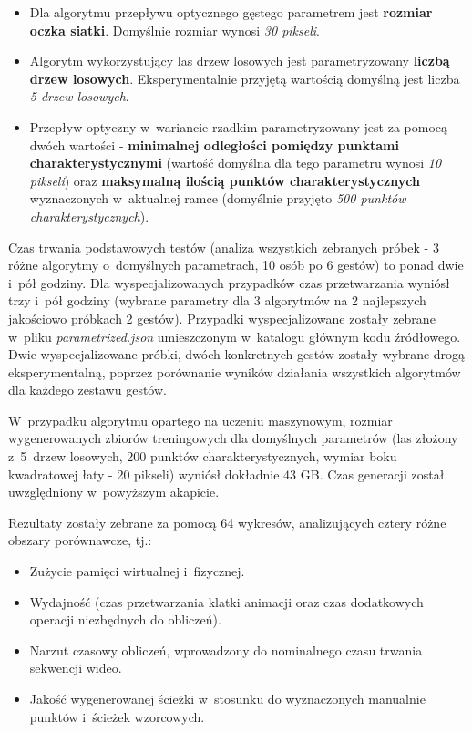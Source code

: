       \begin{itemize}
        \item Dla algorytmu przepływu optycznego gęstego parametrem jest \textbf{rozmiar oczka siatki}. Domyślnie rozmiar wynosi \textit{30 pikseli}.
        \item Algorytm wykorzystujący las drzew losowych jest parametryzowany \textbf{liczbą drzew losowych}. Eksperymentalnie przyjętą wartością domyślną jest liczba \textit{5 drzew losowych}.
        \item Przepływ optyczny w~wariancie rzadkim parametryzowany jest za pomocą dwóch wartości - \textbf{minimalnej odległości pomiędzy punktami charakterystycznymi} (wartość domyślna dla tego parametru wynosi \textit{10 pikseli}) oraz \textbf{maksymalną ilością punktów charakterystycznych} wyznaczonych w~aktualnej ramce (domyślnie przyjęto \textit{500 punktów charakterystycznych}).
      \end{itemize}

    Czas trwania podstawowych testów (analiza wszystkich zebranych próbek - 3 różne algorytmy o~domyślnych parametrach, 10 osób po 6 gestów) to ponad dwie i~pół godziny. Dla wyspecjalizowanych przypadków czas przetwarzania wyniósł trzy i~pół godziny (wybrane parametry dla 3 algorytmów na 2 najlepszych jakościowo próbkach 2 gestów). Przypadki wyspecjalizowane zostały zebrane w~pliku \textit{parametrized.json} umieszczonym w~katalogu głównym kodu źródłowego. Dwie wyspecjalizowane próbki, dwóch konkretnych gestów zostały wybrane drogą eksperymentalną, poprzez porównanie wyników działania wszystkich algorytmów dla każdego zestawu gestów.

    W~przypadku algorytmu opartego na uczeniu maszynowym, rozmiar wygenerowanych zbiorów treningowych dla domyślnych parametrów (las złożony z~5~drzew losowych, 200 punktów charakterystycznych, wymiar boku kwadratowej łaty - 20 pikseli) wyniósł dokładnie $43$ GB. Czas generacji został uwzględniony w~powyższym akapicie.

    Rezultaty zostały zebrane za pomocą 64 wykresów, analizujących cztery różne obszary porównawcze, tj.:
      \begin{itemize}
        \item Zużycie pamięci wirtualnej i~fizycznej.
        \item Wydajność (czas przetwarzania klatki animacji oraz czas dodatkowych operacji niezbędnych do obliczeń).
        \item Narzut czasowy obliczeń, wprowadzony do nominalnego czasu trwania sekwencji wideo.
        \item Jakość wygenerowanej ścieżki w~stosunku do wyznaczonych manualnie punktów i~ścieżek wzorcowych.
      \end{itemize}

